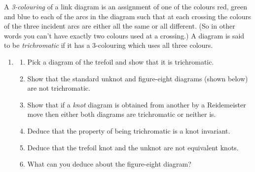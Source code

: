 \documentclass[a4paper]{amsart}
\begin{document}
\begin{exercise}
 A \emph{3-colouring} of a link diagram is an assignment of one of the
 colours red, green and blue to each of the arcs in the diagram such
 that at each crossing the colours of the three incident arcs are
 either all the same or all different.  (So in other words you can't
 have exactly two colours used at a crossing.)  A diagram is said to
 be \emph{trichromatic} if it has a 3-colouring which uses all three
 colours.
 \begin{enumerate}
  \item 
   \begin{enumerate}
    \item Pick a diagram of the trefoil and show that it is trichromatic.
    \item Show that the standard unknot  and figure-eight diagrams (shown below) are
     not trichromatic. 
     \begin{center}
     \end{center}
    \item Show that if a \emph{knot} diagram is obtained from another
     by a Reidemeister move then either both diagrams are trichromatic
     or neither is. 
    \item Deduce that the property of being trichromatic is a knot invariant.
    \item Deduce that the trefoil knot and the unknot are not equivalent knots.
    \item What can you deduce about the figure-eight diagram?

\end{enumerate}
\end{enumerate}
\end{exercise}
\end{document}
